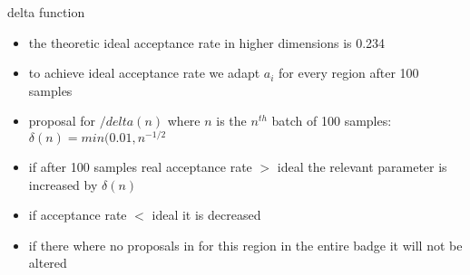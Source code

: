 \begin{frame}
\begin{block}{delta function}
\begin{itemize} 
\item the theoretic ideal acceptance rate in higher dimensions is 0.234
\item to achieve ideal acceptance rate we adapt $a_i$ for every region after 100 samples
\item proposal for $/delta(n)$ where $n$ is the $n^{th}$ batch of 100 samples:\\
$\delta(n) = min(0.01,n^{-1/2}$
\item if after 100 samples real acceptance rate $>$ ideal the relevant parameter is increased by $\delta(n)$
\item if acceptance rate $<$ ideal it is decreased
\item if there where no proposals in for this region in the entire badge it will not be altered 
\end{itemize}
\end{block}
\end{frame}